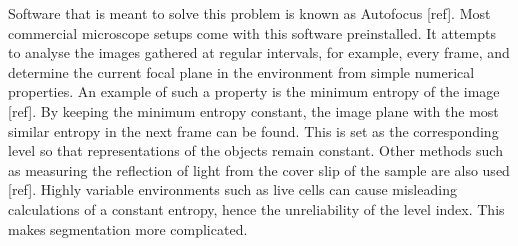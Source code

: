 Software that is meant to solve this problem is known as Autofocus [ref]. Most commercial microscope setups come with this software preinstalled. It attempts to analyse the images gathered at regular intervals, for example, every frame, and determine the current focal plane in the environment from simple numerical properties. An example of such a property is the minimum entropy of the image [ref]. By keeping the minimum entropy constant, the image plane with the most similar entropy in the next frame can be found. This is set as the corresponding level so that representations of the objects remain constant. Other methods such as measuring the reflection of light from the cover slip of the sample are also used [ref]. Highly variable environments such as live cells can cause misleading calculations of a constant entropy, hence the unreliability of the level index. This makes segmentation more complicated.
